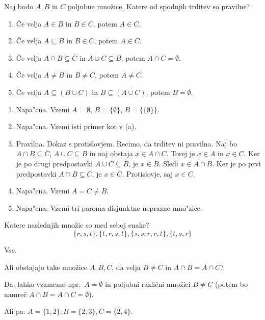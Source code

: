 \documentclass[11pt,paper=b5,footinclude,headinclude]{scrbook} %
\newtheorem{ex}{Vaja\hypertarget{sol:\theex}}[chapter]
\begin{document}
\begin{ex}
Naj bodo $A, B$ in $C$ poljubne množice. Katere od spodnjih trditev so pravilne?
\begin{enumerate}
\item Če velja $A\in B$ in $B\in C$, potem  $A\in C$.
\item Če velja $A\subseteq B$ in $B\in C$, potem  $A\in C$.
\item Če velja $A\cap B\subseteq \overline{C}$ in $A\cup C \subseteq B$, potem  $A\cap C = \emptyset$.
\item Če velja $A\neq B$ in $B\neq C$, potem  $A\neq C$.
\item Če velja $A\subseteq \overline{(B\cup C)}$ in $B\subseteq \overline{(A\cup C)}$, potem  $B=\emptyset$.
\end{enumerate}

\begin{sol}
\begin{enumerate}
\item Napa"cna. Vzemi $A=\emptyset$, $B=\{\emptyset\}$, $B=\{\{\emptyset\}\}$.
\item Napa"cna. Vzemi isti primer kot v (a).
\item Pravilna. Dokaz s protislovjem. Recimo, da trditev ni pravilna. Naj bo $A\cap B\subseteq \overline{C}$, $A\cup C\subseteq B$  in naj obstaja $x\in A\cap C$. Torej je $x\in A$ in $x\in C$. Ker je po drugi predpostavki $A\cup C\subseteq B$, je $x\in B$. Sledi $x\in A \cap B$. Ker je po prvi predpostavki $A\cap B\subseteq \overline{C}$, je $x\in \overline{C}$. Protislovje, saj $x\in C$. 
\item Napa"cna. Vzemi $A=C\neq B$.
\item Napa"cna. Vzemi tri paroma disjunktne neprazne mno"zice.
\end{enumerate}
\end{sol}

\end{ex}

\begin{ex}
Katere naslednjih množic so med seboj enake?
$$\{r,s,t\}, \{t,r,s,t\}, \{s,s,r,r,t\}, \{t,s,r\}$$
\end{ex}
\begin{sol}
    Vse.
\end{sol}


\begin{ex}
Ali obstajajo take množice $A, B, C$, da velja $B\neq C$ in $A\cap B = A\cap C$?
\end{ex}
\begin{sol}
    Da: lahko vzamemo npr.~$A = \emptyset$ in poljubni različni množici $B\neq C$
(potem bo namreč $A\cap B = A\cap C = \emptyset$).

Ali pa: $A = \{1,2\}, B = \{2,3\}, C = \{2,4\}$.
\end{sol}
\end{document}
